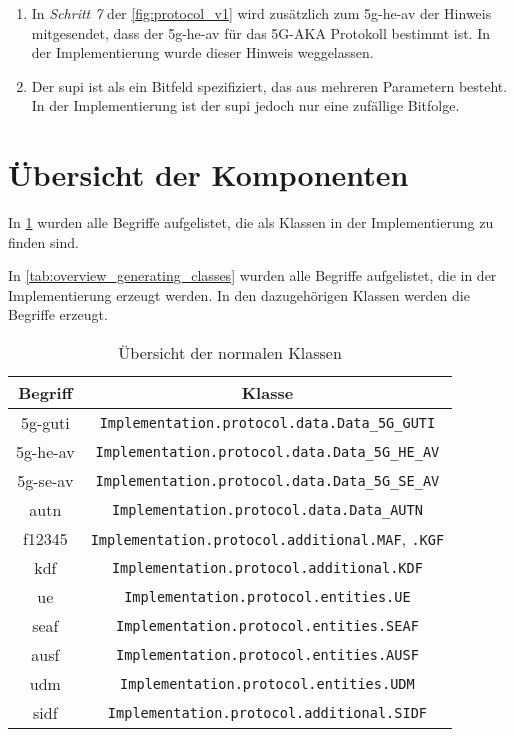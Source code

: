 \begin{enumerate}
\item In \textit{Schritt 7} der \cref{fig:protocol_v1} wird zusätzlich zum \gls{5g-he-av} der Hinweis mitgesendet, dass der \gls{5g-he-av} für das 5G-AKA Protokoll bestimmt ist.
In der Implementierung wurde dieser Hinweis weggelassen.

\item Der \gls{supi} ist als ein Bitfeld spezifiziert, das aus mehreren Parametern besteht.
In der Implementierung ist der \gls{supi} jedoch nur eine zufällige Bitfolge.

\end{enumerate}


\section{Übersicht der Komponenten}

In \cref{tab:overview_classes} wurden alle Begriffe aufgelistet, die als Klassen in der Implementierung zu finden sind.

In \cref{tab:overview_generating_classes} wurden alle Begriffe aufgelistet, die in der Implementierung erzeugt werden.
In den dazugehörigen Klassen werden die Begriffe erzeugt.

\begin{table}
\centering
\begin{tabular}{|c|c|}
\hline
\textbf{Begriff} & \textbf{Klasse} \\ \hline
{\gls{5g-guti}} & \texttt{Implementation.protocol.data.Data\_5G\_GUTI} \\
{\gls{5g-he-av}} & \texttt{Implementation.protocol.data.Data\_5G\_HE\_AV} \\
{\gls{5g-se-av}} & \texttt{Implementation.protocol.data.Data\_5G\_SE\_AV} \\
{\gls{autn}} & \texttt{Implementation.protocol.data.Data\_AUTN} \\
{\gls{f12345}} & \texttt{Implementation.protocol.additional.MAF}, \texttt{.KGF} \\
{\gls{kdf}} & \texttt{Implementation.protocol.additional.KDF} \\ 
\hline
{\gls{ue}} & \texttt{Implementation.protocol.entities.UE} \\
{\gls{seaf}} & \texttt{Implementation.protocol.entities.SEAF} \\
{\gls{ausf}} & \texttt{Implementation.protocol.entities.AUSF} \\
{\gls{udm}} & \texttt{Implementation.protocol.entities.UDM} \\
{\gls{sidf}} & \texttt{Implementation.protocol.additional.SIDF} \\
\hline
\end{tabular}
\caption{Übersicht der normalen Klassen}
\label{tab:overview_classes}
\end{table}


